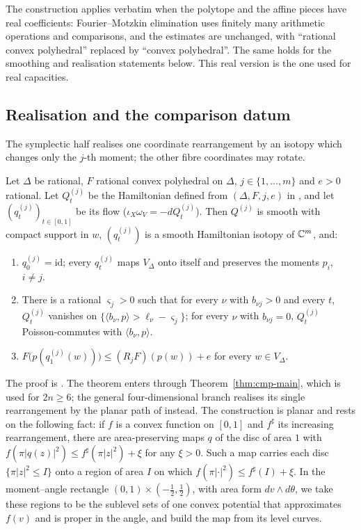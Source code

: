 The construction applies verbatim when the polytope and the affine pieces have real coefficients:
Fourier--Motzkin elimination uses finitely many arithmetic operations and comparisons, and the estimates are
unchanged, with ``rational convex polyhedral'' replaced by ``convex polyhedral''. The same holds for the smoothing
and realisation statements below. This real version is the one used for real capacities.

\subsection{Realisation and the comparison datum}\label{sec:cmp-realisation}

The symplectic half realises one coordinate rearrangement by an isotopy which changes only the $j$-th
moment; the other fibre coordinates may rotate.

\begin{theorem}\label{thm:cmp-realisation}
Let $\Delta$ be rational, $F$ rational convex polyhedral on $\Delta$, $j\in\{1,\dots,m\}$ and $e>0$ rational. Let
$Q^{(j)}_t$ be the Hamiltonian defined from $(\Delta,F,j,e)$ in , and let
$(q^{(j)}_t)_{t\in[0,1]}$ be its flow ($\iota_{X}\omega_V=-dQ^{(j)}_t$). Then $Q^{(j)}$ is smooth with compact support
in $w$, $(q^{(j)}_t)$ is a smooth Hamiltonian isotopy of $\mathbb{C}^m$, and:
\begin{enumerate}[label=(\alph*)]
\item $q^{(j)}_0=\mathrm{id}$; every $q^{(j)}_t$ maps $V_\Delta$ onto itself and preserves the moments $p_i$, $i\ne j$.
\item There is a rational $\varsigma_j>0$ such that for every $\nu$ with $b_{\nu j}>0$ and every $t$, $Q^{(j)}_t$
 vanishes on $\{\langle b_\nu,p\rangle>\ell_\nu-\varsigma_j\}$; for every $\nu$ with $b_{\nu j}=0$, $Q^{(j)}_t$
 Poisson-commutes with $\langle b_\nu,p\rangle$.
\item $F\bigl(p(q^{(j)}_1(w))\bigr)\le(R_jF)(p(w))+e$ for every $w\in V_\Delta$.
\end{enumerate}
\end{theorem}

The proof is . The theorem enters through Theorem~\ref{thm:cmp-main}, which is used for
$2n\ge6$; the general four-dimensional branch realises its single rearrangement by the planar path of
 instead. The construction is planar and rests on the following fact: if
$f$ is a convex function on $[0,1]$ and $f^\sharp$ its increasing rearrangement, there are area-preserving maps
$q$ of the disc of area $1$ with $f(\pi|q(z)|^2)\le f^\sharp(\pi|z|^2)+\xi$ for any $\xi>0$. Such a map carries
each disc $\{\pi|z|^2\le I\}$ onto a region of area $I$ on which $f(\pi|\cdot|^2)\le f^\sharp(I)+\xi$. In the
moment--angle rectangle $(0,1)\times(-\frac12,\frac12)$, with area form $dv\wedge d\theta$, we take these regions to
be the sublevel sets of one convex potential that approximates $f(v)$ and is proper in the angle, and build the map
from its level curves.

